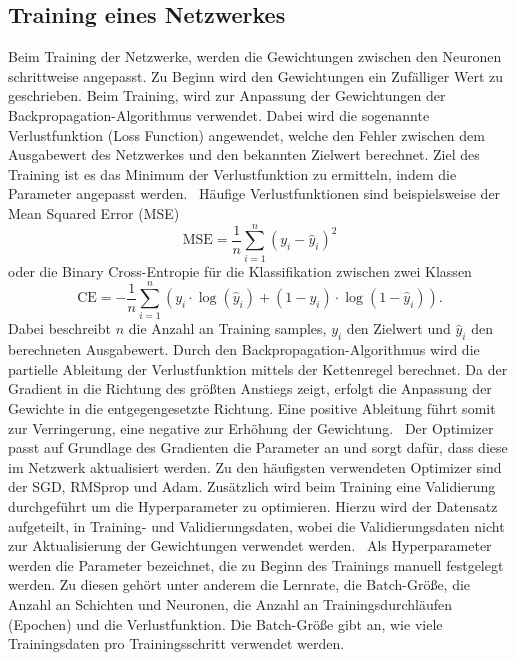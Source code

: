 \subsection{Training eines Netzwerkes}
Beim Training der Netzwerke, werden die Gewichtungen zwischen den Neuronen schrittweise angepasst. 
Zu Beginn wird den Gewichtungen ein Zufälliger Wert zu geschrieben.
Beim Training, wird zur Anpassung der Gewichtungen der Backpropagation-Algorithmus verwendet.
Dabei wird die sogenannte Verlustfunktion (Loss Function) angewendet, welche den Fehler zwischen dem Ausgabewert des Netzwerkes und den bekannten Zielwert berechnet.
Ziel des Training ist es das Minimum der Verlustfunktion zu ermitteln, indem die Parameter angepasst werden.~\cite{datascience}
Häufige Verlustfunktionen sind beispielsweise der Mean Squared Error (MSE)
\begin{equation}
  \text{MSE}  =  \frac{1}{n} \sum_{i=1}^{n} (y_i - \hat{y}_i)^2
\end{equation}
oder die Binary Cross-Entropie für die Klassifikation zwischen zwei Klassen  
\begin{equation}
\text{CE} = -\frac{1}{n} \sum_{i=1}^{n} \left( y_i \cdot \log(\hat{y}_i) + (1 - y_i) \cdot \log(1 - \hat{y}_i) \right).
\label{eq:BCE}
\end{equation}
Dabei beschreibt $n$ die Anzahl an Training samples, $y_i$ den Zielwert und $\hat{y}_i$ den berechneten Ausgabewert.
Durch den Backpropagation-Algorithmus wird die partielle Ableitung der Verlustfunktion mittels der Kettenregel berechnet.
Da der Gradient in die Richtung des größten Anstiegs zeigt, erfolgt die Anpassung der Gewichte in die entgegengesetzte Richtung. 
Eine positive Ableitung führt somit zur Verringerung, eine negative zur Erhöhung der Gewichtung.~\cite{neuralnet}
Der Optimizer passt auf Grundlage des Gradienten die Parameter an und sorgt dafür, dass diese im Netzwerk aktualisiert werden.
Zu den häufigsten verwendeten Optimizer sind der SGD, RMSprop und Adam.
Zusätzlich wird beim Training eine Validierung durchgeführt um die Hyperparameter zu optimieren. 
Hierzu wird der Datensatz aufgeteilt, in Training- und Validierungsdaten, wobei die Validierungsdaten nicht zur Aktualisierung 
der Gewichtungen verwendet werden.~\cite{Yamashita2018}
Als Hyperparameter werden die Parameter bezeichnet, die zu Beginn des Trainings manuell festgelegt werden.
Zu diesen gehört unter anderem die Lernrate, die Batch-Größe, die Anzahl an Schichten und Neuronen, die Anzahl an Trainingsdurchläufen (Epochen)
und die Verlustfunktion.
Die Batch-Größe gibt an, wie viele Trainingsdaten pro Trainingsschritt verwendet werden.~\cite{datascience} 
